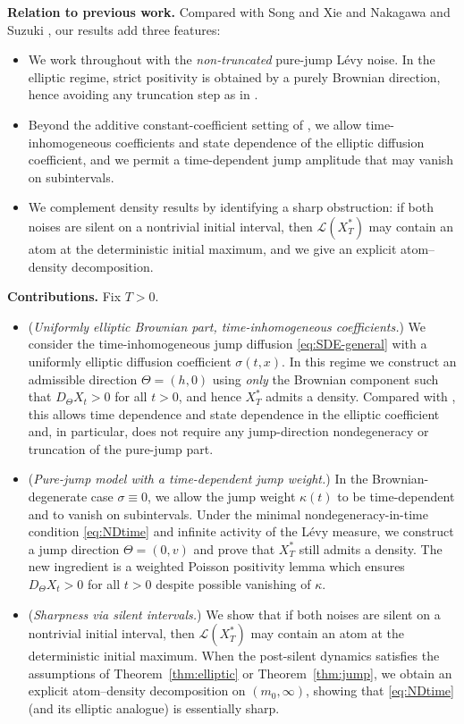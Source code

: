 \documentclass[11pt]{article}
\newcommand{\1}{\mathbf{1}}
\newcommand{\law}{\mathcal{L}}
\newcommand{\Xstar}{X^{\ast}}
\theoremstyle{plain}
\theoremstyle{definition}
\theoremstyle{remark}
\begin{document}
\medskip
\noindent\textbf{Relation to previous work.}
Compared with Song and Xie \cite{SongXie2018} and Nakagawa and Suzuki \cite{NakagawaSuzuki2024}, our results add three features:
\begin{itemize}[leftmargin=2.2em]
\item[(R1)] We work throughout with the \emph{non-truncated} pure-jump L\'evy noise.
In the elliptic regime, strict positivity is obtained by a purely Brownian direction, hence avoiding any truncation step as in \cite{SongXie2018}.
\item[(R2)] Beyond the additive constant-coefficient setting of \cite{NakagawaSuzuki2024}, we allow time-inhomogeneous coefficients and state dependence of the elliptic diffusion coefficient, and we permit a time-dependent jump amplitude that may vanish on subintervals.
\item[(R3)] We complement density results by identifying a sharp obstruction:
if both noises are silent on a nontrivial initial interval, then $\law(\Xstar_T)$ may contain an atom at the deterministic initial maximum, and we give an explicit atom--density decomposition.
\end{itemize}

\medskip
\noindent\textbf{Contributions.}
Fix $T>0$.
\begin{itemize}[leftmargin=2.2em]
\item[(C1)] (\emph{Uniformly elliptic Brownian part, time-inhomogeneous coefficients.})
We consider the time-inhomogeneous jump diffusion \eqref{eq:SDE-general} with a uniformly elliptic diffusion coefficient $\sigma(t,x)$.
In this regime we construct an admissible direction $\Theta=(h,0)$ using \emph{only} the Brownian component such that $D_\Theta X_t>0$ for all $t>0$,
and hence $\Xstar_T$ admits a density.
Compared with \cite{NakagawaSuzuki2024}, this allows time dependence and state dependence in the elliptic coefficient and, in particular,
does not require any jump-direction nondegeneracy or truncation of the pure-jump part.
\item[(C2)] (\emph{Pure-jump model with a time-dependent jump weight.})
In the Brownian-degenerate case $\sigma\equiv 0$, we allow the jump weight $\kappa(t)$ to be time-dependent and to vanish on subintervals.
Under the minimal nondegeneracy-in-time condition \eqref{eq:NDtime} and infinite activity of the L\'evy measure,
we construct a jump direction $\Theta=(0,v)$ and prove that $\Xstar_T$ still admits a density.
The new ingredient is a weighted Poisson positivity lemma which ensures $D_\Theta X_t>0$ for all $t>0$ despite possible vanishing of $\kappa$.
\item[(C3)] (\emph{Sharpness via silent intervals.})
We show that if both noises are silent on a nontrivial initial interval, then $\law(\Xstar_T)$ may contain an atom at the deterministic initial maximum.
When the post-silent dynamics satisfies the assumptions of Theorem~\ref{thm:elliptic} or Theorem~\ref{thm:jump}, we obtain an explicit atom--density decomposition on $(m_0,\infty)$,
showing that \eqref{eq:NDtime} (and its elliptic analogue) is essentially sharp.
\end{itemize}
\end{document}
